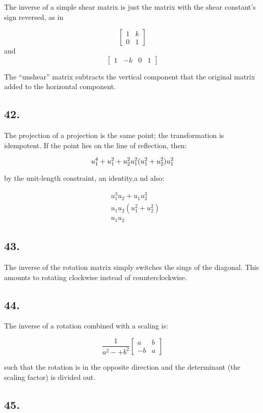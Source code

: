 \documentclass[]{article}
\newcommand{\m}[1]{\begin{bmatrix}#1\end{bmatrix}}
\newcommand{\meq}[1]{\begin{split}#1\end{split}}
\begin{document}
{The inverse of a simple shear matrix is just the matrix with the shear
constant's sign reversed, as in

\[\m{1&k\\0&1}\] and \[\m{1&-k&0&1}\]

The ``unshear'' matrix subtracts the vertical component that the
original matrix added to the horizontal component.

\hypertarget{section-26}{%
\subsection{42.}\label{section-26}}

The projection of a projection is the same point; the transformation is
idempotent. If the point lies on the line of reflection, then:

\[u_1^4+u_1^2+u_2^2\\
u_1^2(u_1^2+u_2^2)\\
u_1^2\]

by the unit-length constraint, an identity,a nd also:

\[\meq{&u_1^3u_2+u_1u_2^3\\
&u_1u_2(u_1^2+u_2^2)\\
&u_1u_2}\]

\hypertarget{section-27}{%
\subsection{43.}\label{section-27}}

The inverse of the rotation matrix simply switches the sings of the
diagonal. This amounts to rotating clockwise instead of
counterclockwise.

\hypertarget{section-28}{%
\subsection{44.}\label{section-28}}

The inverse of a rotation combined with a scaling is:

\[\frac{1}{a^2-+b^2}\m{a&b\\
-b&a}\]

such that the rotation is in the opposite direction and the determinant
(the scaling factor) is divided out.

\hypertarget{section-29}{%
\subsection{45.}\label{section-29}}

}
\end{document}
